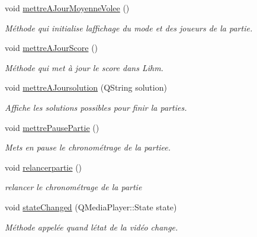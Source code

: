 \begin{DoxyCompactItemize}
void \hyperlink{class_ihm_abafc4398a910be8ab95a75fbdf176426}{mettre\+A\+Jour\+Moyenne\+Volee} ()
\begin{DoxyCompactList}\small\item\em Méthode qui initialise l\textquotesingle{}affichage du mode et des joueurs de la partie. \end{DoxyCompactList}\item 
void \hyperlink{class_ihm_a238255f517506367fe8913b2dad50c65}{mettre\+A\+Jour\+Score} ()
\begin{DoxyCompactList}\small\item\em Méthode qui met à jour le score dans L\textquotesingle{}ihm. \end{DoxyCompactList}\item 
void \hyperlink{class_ihm_a27b24d133887431399b4696a4eae02e6}{mettre\+A\+Joursolution} (Q\+String solution)
\begin{DoxyCompactList}\small\item\em Affiche les solutions possibles pour finir la parties. \end{DoxyCompactList}\item 
void \hyperlink{class_ihm_ab8456da276715f99ba373b71313592de}{mettre\+Pause\+Partie} ()
\begin{DoxyCompactList}\small\item\em Mets en pause le chronométrage de la partiee. \end{DoxyCompactList}\item 
void \hyperlink{class_ihm_a3480957ba23548b30dddc717f6cfa577}{relancerpartie} ()
\begin{DoxyCompactList}\small\item\em relancer le chronométrage de la partie \end{DoxyCompactList}\item 
void \hyperlink{class_ihm_a3c815827527ca8f9c586e001e8e95721}{state\+Changed} (Q\+Media\+Player\+::\+State state)
\begin{DoxyCompactList}\small\item\em Méthode appelée quand l\textquotesingle{}état de la vidéo change. \end{DoxyCompactList}\end{DoxyCompactItemize}
